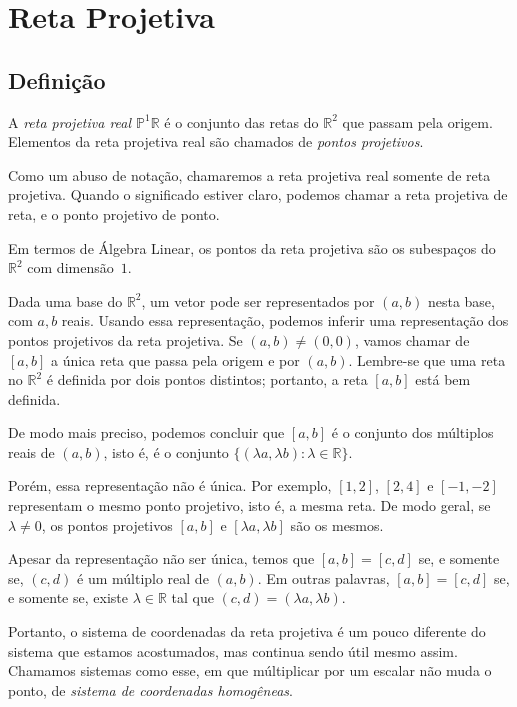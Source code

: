 \chapter{Reta Projetiva}

\section{Definição}

\begin{defn}
A \emph{reta projetiva real \(\mathbb{P}^1\mathbb{R}\)} é o conjunto das retas do \(\mathbb{R}^2\) que passam pela origem.
Elementos da reta projetiva real são chamados de \emph{pontos projetivos}.
\end{defn}

Como um abuso de notação, chamaremos a reta projetiva real somente de reta projetiva.
Quando o significado estiver claro, podemos chamar a reta projetiva de reta, e o ponto projetivo de ponto.

Em termos de Álgebra Linear, os pontos da reta projetiva são os subespaços do $\mathbb{R}^2$ com dimensão~$1$.

Dada uma base do \(\mathbb{R}^2\), um vetor pode ser representados por \((a, b)\) nesta base, com \(a, b\) reais.
Usando essa representação, podemos inferir uma representação dos pontos projetivos da reta projetiva.
Se \((a, b) \neq (0, 0)\), vamos chamar de \([a, b]\) a única reta que passa pela origem e por \((a, b)\).
Lembre-se que uma reta no \(\mathbb{R}^2\) é definida por dois pontos distintos; portanto, a reta \([a, b]\) está bem definida.

De modo mais preciso, podemos concluir que \([a, b]\) é o conjunto dos múltiplos reais de \((a, b)\), isto é, é o conjunto \(\{ (\lambda a, \lambda b) : \lambda \in \mathbb{R}\}\).

Porém, essa representação não é única.
Por exemplo, \([1, 2]\), \([2, 4]\) e \([-1, -2]\) representam o mesmo ponto projetivo, isto é, a mesma reta.
De modo geral, se \(\lambda \neq 0\), os pontos projetivos \([a, b]\) e \([\lambda a, \lambda b]\) são os mesmos.

Apesar da representação não ser única, temos que \([a, b] = [c, d]\) se, e somente se, \((c, d)\) é um múltiplo real de \((a, b)\).
Em outras palavras, \([a, b] = [c, d]\) se, e somente se, existe \(\lambda \in \mathbb{R}\) tal que \((c, d) = (\lambda a, \lambda b)\).

Portanto, o sistema de coordenadas da reta projetiva é um pouco diferente do sistema que estamos acostumados, mas continua sendo útil mesmo assim. Chamamos sistemas como esse, em que múltiplicar por um escalar não muda o ponto, de \emph{sistema de coordenadas homogêneas}.

